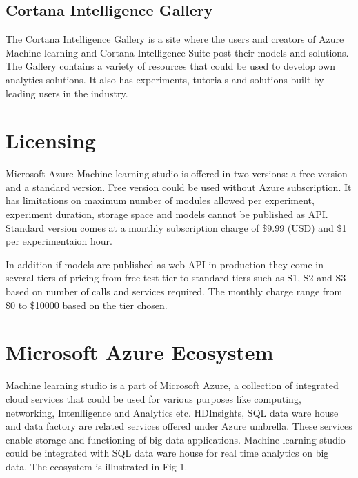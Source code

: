 \documentclass[9pt,twocolumn,twoside]{../../styles/osajnl}
\begin{document}
\subsection{Cortana Intelligence Gallery}
The Cortana Intelligence Gallery\cite{www-cortanaIntelligenceGallery}
is a site where the users and creators of Azure Machine learning and
Cortana Intelligence Suite post their models and solutions. The
Gallery contains a variety of resources that could be used to develop
own analytics solutions. It also has experiments, tutorials and
solutions built by leading users in the industry.

\section{Licensing}

Microsoft Azure Machine learning studio is offered in two versions: a
free version and a standard version.\cite{www-azureMLPricing} Free
version could be used without Azure subscription. It has limitations
on maximum number of modules allowed per experiment, experiment
duration, storage space and models cannot be published as
API. Standard version comes at a monthly subscription charge of \$9.99
(USD) and \$1 per experimentaion hour.

In addition if models are published as web API in production they come
in several tiers of pricing from free test tier to standard tiers such as
S1, S2 and S3  based on number of calls and services required. The
monthly charge range from \$0 to \$10000 based on the tier chosen.

\section{Microsoft Azure Ecosystem}
Machine learning studio is a part of Microsoft Azure, a collection of
integrated cloud services that could be used for various purposes like
computing, networking, Intenlligence and Analytics etc. HDInsights,
SQL data ware house and data factory are related services offered
under Azure umbrella. These services enable storage and functioning of
big data applications. Machine learning studio could be integrated
with SQL data ware house for real time analytics on big data. The
ecosystem is illustrated in Fig 1.
\end{document}
